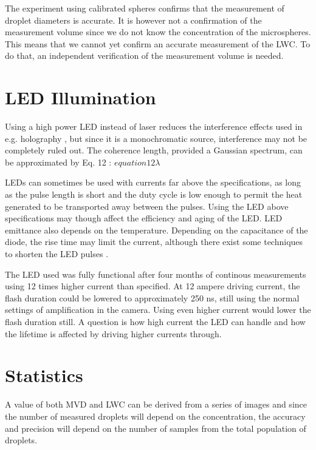 The experiment using calibrated spheres confirms that the measurement of droplet diameters is accurate. It is however not a confirmation of the measurement volume \cite{ryd2016} since we do not know the concentration of the microspheres. This means that we cannot yet confirm an accurate measurement of the LWC. To do that, an independent verification of the measurement volume is needed.


\section{LED Illumination}

Using a high power LED instead of laser reduces the interference effects used in e.g. holography \cite{henn2013}, but since it is a monochromatic source, interference may not be completely ruled out. The coherence length, provided a Gaussian spectrum, can be approximated by Eq. 12 \cite{akcay2002}: $equation12λ$

LEDs can sometimes be used with currents far above the specifications, as long as the pulse length is short and the duty cycle is low enough to permit the heat generated to be transported away between the pulses. Using the LED above specifications may though affect the efficiency and aging of the LED. LED emittance also depends on the temperature. Depending on the capacitance of the diode, the rise time may limit the current, although there exist some techniques to shorten the LED pulses \cite{tanaka2011,vele2007}.

The LED used was fully functional after four months of continous measurements using 12 times higher current than specified. At 12 ampere driving current, the flash duration could be lowered to approximately 250 ns, still using the normal settings of amplification in the camera. Using even higher current would lower the flash duration still. A question is how high current the LED can handle and how the lifetime is affected by driving higher currents through.

\section{Statistics}

A value of both MVD and LWC can be derived from a series of images and since the number of measured droplets will depend on the concentration, the accuracy and precision will depend on the number of samples from the total population of droplets. 



